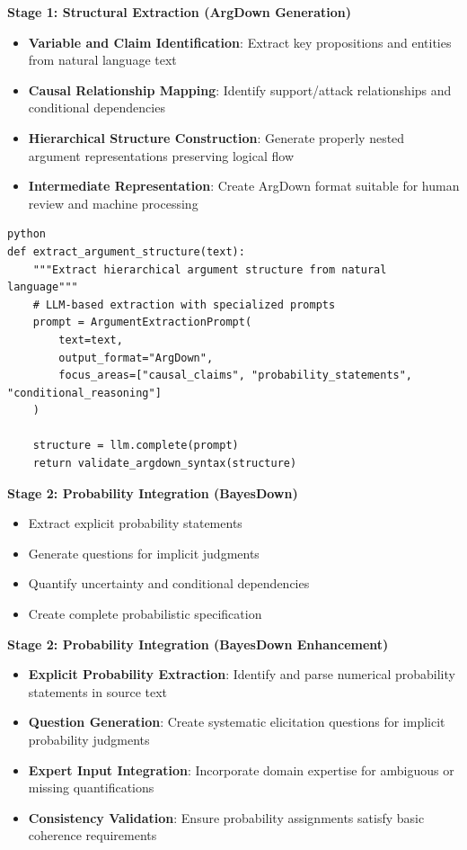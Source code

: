 \documentclass[
  11pt,
  letterpaper,
]{book}
\providecommand{\tightlist}{%
  \setlength{\itemsep}{0pt}\setlength{\parskip}{0pt}}
\begin{document}
\textbf{Stage 1: Structural Extraction (ArgDown Generation)}

\begin{itemize}
\tightlist
\item
  \textbf{Variable and Claim Identification}: Extract key propositions
  and entities from natural language text
\item
  \textbf{Causal Relationship Mapping}: Identify support/attack
  relationships and conditional dependencies
\item
  \textbf{Hierarchical Structure Construction}: Generate properly nested
  argument representations preserving logical flow
\item
  \textbf{Intermediate Representation}: Create ArgDown format suitable
  for human review and machine processing
\end{itemize}

\begin{verbatim}
python
def extract_argument_structure(text):
    """Extract hierarchical argument structure from natural language"""
    # LLM-based extraction with specialized prompts
    prompt = ArgumentExtractionPrompt(
        text=text,
        output_format="ArgDown",
        focus_areas=["causal_claims", "probability_statements", "conditional_reasoning"]
    )
    
    structure = llm.complete(prompt)
    return validate_argdown_syntax(structure)
\end{verbatim}

\textbf{Stage 2: Probability Integration (BayesDown)}

\begin{itemize}
\tightlist
\item
  Extract explicit probability statements
\item
  Generate questions for implicit judgments
\item
  Quantify uncertainty and conditional dependencies
\item
  Create complete probabilistic specification
\end{itemize}

\textbf{Stage 2: Probability Integration (BayesDown Enhancement)}

\begin{itemize}
\tightlist
\item
  \textbf{Explicit Probability Extraction}: Identify and parse numerical
  probability statements in source text
\item
  \textbf{Question Generation}: Create systematic elicitation questions
  for implicit probability judgments
\item
  \textbf{Expert Input Integration}: Incorporate domain expertise for
  ambiguous or missing quantifications
\item
  \textbf{Consistency Validation}: Ensure probability assignments
  satisfy basic coherence requirements
\end{itemize}
\end{document}
